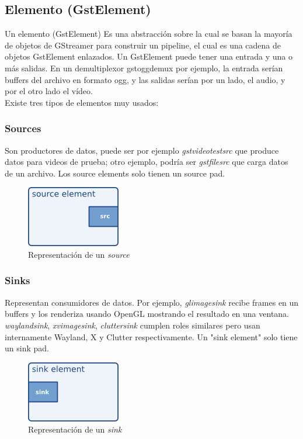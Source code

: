 \documentclass[a4paper,openright,12pt]{report}
\begin{document}
\subsection{Elemento (GstElement)}
Un elemento (GstElement) Es una abstracción sobre la cual se basan la mayoría de
objetos de GStreamer para construir un pipeline, el cual es una cadena de
objetos GstElement enlazados. Un GstElement puede tener una entrada y una o más
salidas. En un demultiplexor gstoggdemux por ejemplo, la entrada serían buffers
del archivo en formato ogg, y las salidas serían por un lado, el audio, y por
el otro lado el vídeo.\\
Existe tres tipos de elementos muy usados:\\
\subsubsection{Sources}
Son productores de datos, puede ser por ejemplo \textit{gstvideotestsrc} que
produce datos para videos de prueba; otro ejemplo, podría ser
\textit{gstfilesrc} que carga datos de un archivo. Los source elements solo
tienen un source pad.

\begin{figure}[h]
  \centering
    \includegraphics{../images/pwg-src-element.png}\par
  \caption{Representación de un \textit{source}}
\end{figure}

\subsubsection{Sinks}
Representan consumidores de datos. Por ejemplo, \textit{glimagesink} recibe
frames en un buffers y los renderiza usando OpenGL mostrando el resultado en una
ventana. \textit{waylandsink}, \textit{xvimagesink}, \textit{cluttersink}
cumplen roles similares pero usan internamente Wayland, X y Clutter
respectivamente. Un "sink element" solo tiene un sink pad.

\begin{figure}[h]
  \centering
    \includegraphics{../images/pwg-sink-element.png}\par
  \caption{Representación de un \textit{sink}}
\end{figure}
\end{document}
